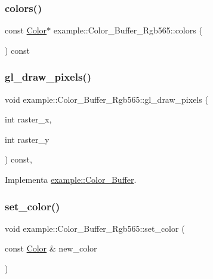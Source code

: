 \subsubsection{\texorpdfstring{colors()}{colors()}\hspace{0.1cm}{\footnotesize\ttfamily [2/2]}}
{\footnotesize\ttfamily const \mbox{\hyperlink{structexample_1_1_color___buffer___rgb565_1_1_color}{Color}}$\ast$ example\+::\+Color\+\_\+\+Buffer\+\_\+\+Rgb565\+::colors (\begin{DoxyParamCaption}{ }\end{DoxyParamCaption}) const\hspace{0.3cm}{\ttfamily [inline]}}

\mbox{\label{classexample_1_1_color___buffer___rgb565_a990c8e8f928b672ab82f7364b12eadb2}} 
\subsubsection{\texorpdfstring{gl\_draw\_pixels()}{gl\_draw\_pixels()}}
{\footnotesize\ttfamily void example\+::\+Color\+\_\+\+Buffer\+\_\+\+Rgb565\+::gl\+\_\+draw\+\_\+pixels (\begin{DoxyParamCaption}\item[{int}]{raster\+\_\+x,  }\item[{int}]{raster\+\_\+y }\end{DoxyParamCaption}) const\hspace{0.3cm}{\ttfamily [inline]}, {\ttfamily [virtual]}}



Implementa \mbox{\hyperlink{classexample_1_1_color___buffer_a793b667028b2eb7efde2cee76066eac7}{example\+::\+Color\+\_\+\+Buffer}}.

\mbox{\label{classexample_1_1_color___buffer___rgb565_a416142e2f71407a88cc2eebf61a68b47}} 
\subsubsection{\texorpdfstring{set\_color()}{set\_color()}\hspace{0.1cm}{\footnotesize\ttfamily [1/2]}}
{\footnotesize\ttfamily void example\+::\+Color\+\_\+\+Buffer\+\_\+\+Rgb565\+::set\+\_\+color (\begin{DoxyParamCaption}\item[{const \mbox{\hyperlink{structexample_1_1_color___buffer___rgb565_1_1_color}{Color}} \&}]{new\+\_\+color }\end{DoxyParamCaption})\hspace{0.3cm}{\ttfamily [inline]}}

